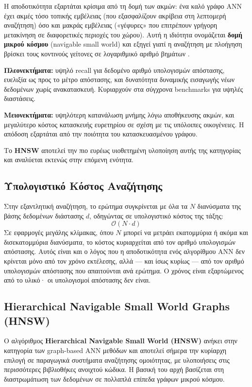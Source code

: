 \documentclass[12pt,a4paper]{article}
\begin{document}
Η αποδοτικότητα εξαρτάται κρίσιμα από τη δομή των ακμών: ένα καλό γράφο ANN έχει ακμές τόσο τοπικής εμβέλειας (που εξασφαλίζουν ακρίβεια στη λεπτομερή αναζήτηση) όσο και μακράς εμβέλειας («γέφυρες» που επιτρέπουν γρήγορη μετακίνηση σε διαφορετικές περιοχές του χώρου). Αυτή η ιδιότητα ονομάζεται \textbf{δομή μικρού κόσμου} (navigable small world) και εξηγεί γιατί η αναζήτηση με πλοήγηση βρίσκει τους κοντινούς γείτονες σε λογαριθμικό αριθμό βημάτων \cite{malkov2018hnsw}.

\textbf{Πλεονεκτήματα:} υψηλό recall για δεδομένο αριθμό υπολογισμών απόστασης, ευελιξία ως προς το μέτρο απόστασης, και δυνατότητα δυναμικής εισαγωγής νέων δεδομένων χωρίς ανακατασκευή. Κυριαρχούν στα σύγχρονα benchmarks για υψηλές διαστάσεις.

\textbf{Μειονεκτήματα:} υψηλότερη κατανάλωση μνήμης λόγω αποθήκευσης ακμών, και μεγαλύτερο κόστος κατασκευής ευρετηρίου σε σχέση με τις υπόλοιπες οικογένειες. Η απόδοση εξαρτάται από την ποιότητα του κατασκευασμένου γράφου.

Το \textbf{HNSW} αποτελεί την πιο ευρέως υιοθετημένη υλοποίηση αυτής της κατηγορίας και αναλύεται εκτενώς στην επόμενη ενότητα.

\subsection{Υπολογιστικό Κόστος Αναζήτησης}
Στην εξαντλητική αναζήτηση, το ερώτημα συγκρίνεται με όλα τα $Ν$ διανύσματα της βάσης δεδομένων διάστασης $d$, οδηγώντας σε υπολογιστικό κόστος της τάξης:
\[
\mathcal{O}(N\cdot d)
\]
Σε εφαρμογές μεγάλης κλίμακας, όπου $N$ μπορεί να μετράει εκατομμύρια ή ακόμα και δισεκατομμύρια διανύσματα, το κόστος κυριαρχείται από τον αριθμό υπολογισμών απόστασης. Αυτός είναι και ο λόγος που η αποδοτικότητα ενός αλγορίθμου ANN δεν κρίνεται μόνο από τον χρόνο εκτέλεσης, αλλά --- και ίσως κυρίως --- από τον αριθμό υπολογισμών απόστασης που απαιτούνται ανά ερώτημα. Ο χρόνος είναι εξαρτώμενος από το υλικό· οι υπολογισμοί απόστασης δεν είναι.

\subsection{Hierarchical Navigable Small World Graphs (HNSW)}
Ο αλγόριθμος \textbf{Hierarchical Navigable Small World (HNSW)} ανήκει στην κατηγορία των graph-based ANN μεθόδων και αποτελεί σήμερα την κυρίαρχη επιλογή σε παραγωγικά συστήματα αναζήτησης ομοιότητας, με υλοποιήσεις στις περισσότερες βιβλιοθήκες ανοιχτού κώδικα. Η βασική του αρχή βασίζεται στη διαστρωμάτωση των δεδομένων σε πολλαπλά επίπεδα γράφων μικρού κόσμου.
\end{document}
